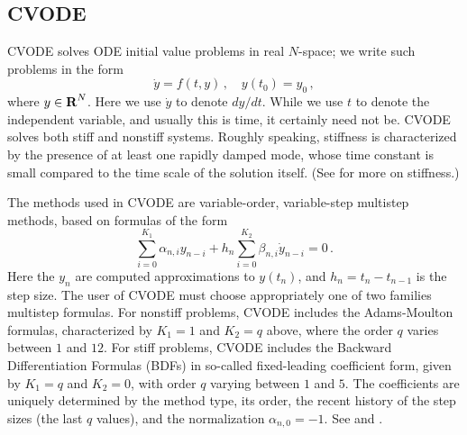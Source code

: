 \subsection{CVODE}\label{ss:cvode}

CVODE solves ODE initial value problems in real $N$-space; we write
such problems in the form
\begin{equation}\label{ODE} 
  \dot{y} = f(t,y) \, ,\quad y(t_0) = y_0 \, ,
\end{equation}
where $y \in \mbox{\bf R}^N$.
Here we use $\dot{y}$ to denote $dy/dt$.  While we use $t$ to denote
the independent variable, and usually this is time, it certainly need
not be.  CVODE solves both stiff and nonstiff systems.  Roughly
speaking, stiffness is characterized by the presence of at least one
rapidly damped mode, whose time constant is small compared to the time
scale of the solution itself.  (See \cite{HaWa:91} for more on stiffness.)

The methods used in CVODE are variable-order, variable-step multistep
methods, based on formulas of the form
\begin{equation*}
 \sum_{i = 0}^{K_1} \alpha_{n,i} y_{n-i} + 
     h_n \sum_{i = 0}^{K_2} \beta_{n,i} \dot{y}_{n-i} = 0 \, .
\end{equation*}
Here the $y_n$ are computed approximations to $y(t_n)$, and
$h_n = t_n - t_{n-1}$ is the step size.  The user of CVODE must choose
appropriately one of two families multistep formulas.  For nonstiff problems,
CVODE includes the Adams-Moulton formulas, characterized by $K_1 = 1$
and $K_2 = q$ above, where the order $q$ varies between $1$ and $12$.
For stiff problems, CVODE includes the Backward Differentiation
Formulas (BDFs) in so-called fixed-leading coefficient form, given by
$K_1 = q$ and $K_2 = 0$, with order $q$ varying between $1$ and $5$.
The coefficients are uniquely determined by the method type, its
order, the recent history of the step sizes (the last $q$ values),
and the normalization $\alpha_{n,0} = -1$.  See \cite{ByHi:75} and
\cite{JaSD:80}.

